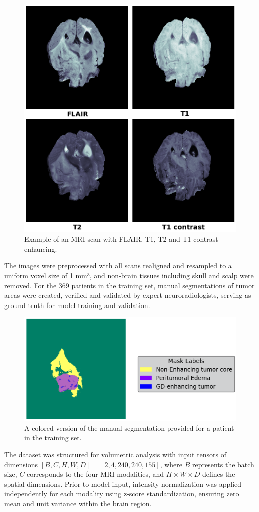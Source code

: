 \documentclass[10pt,twocolumn,letterpaper]{article}
\begin{document}
\begin{figure}[H]
\centering
\includegraphics[width=0.55\linewidth]{img/example_MRI.png}
\caption{Example of an MRI scan with FLAIR, T1, T2 and T1 contrast-enhancing.}
\end{figure}

The images were preprocessed with all scans realigned and resampled to a uniform voxel size of 1 mm³, and non-brain tissues including skull and scalp were removed. For the 369 patients in the training set, manual segmentations of tumor areas were created, verified and validated by expert neuroradiologists, serving as ground truth for model training and validation.

\begin{figure}[H]
\centering
\includegraphics[width=0.65\linewidth]{img/groundtruth_example.png}
\caption{A colored version of the manual segmentation provided for a patient in the training set.}
\end{figure}

The dataset was structured for volumetric analysis with input tensors of dimensions $[B, C, H, W, D] = [2, 4, 240, 240, 155]$, where $B$ represents the batch size, $C$ corresponds to the four MRI modalities, and $H \times W \times D$ defines the spatial dimensions. Prior to model input, intensity normalization was applied independently for each modality using z-score standardization, ensuring zero mean and unit variance within the brain region.
\end{document}
